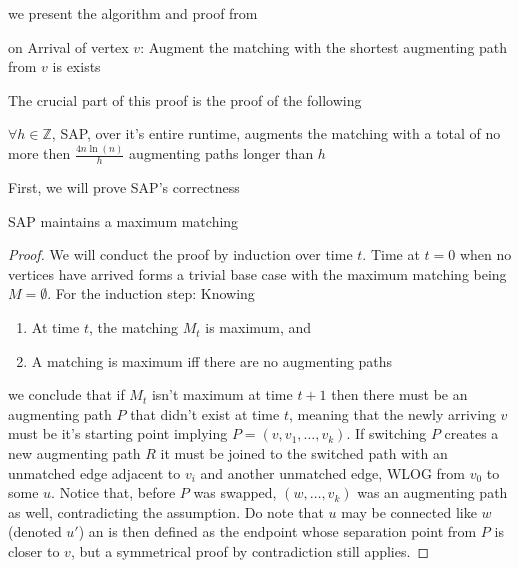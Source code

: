 we present the algorithm and proof from \cite{obmRecourse}
\begin{algorithm}
	\caption{SAP}
	\label{alg:sap}
	\begin{algorithmic}
		\item on Arrival of vertex $v$: Augment the matching with the shortest augmenting path from $v$ is exists
	\end{algorithmic}
\end{algorithm}

The crucial part of this proof is the proof of the following
\begin{lemma}
	\label{recourse-crucial}
	$\forall h\in\mathbb{Z}$, SAP, over it's entire runtime, augments the matching with a total of no more then $\frac{4n\ln(n)}{h}$ augmenting paths longer than $h$
\end{lemma}
First, we will prove SAP's correctness

\begin{lemma}
	SAP maintains a maximum matching
\end{lemma}
\begin{proof}
	We will conduct the proof by induction over time $t$. Time at $t=0$ when no vertices have arrived forms a trivial base case with the maximum matching being $M=\emptyset$. For the induction step:
	Knowing
	\begin{enumerate}
		\item At time $t$, the matching $M_t$ is maximum, and
		\item A matching is maximum iff there are no augmenting paths
	\end{enumerate}
	we conclude that if $M_t$ isn't maximum at time $t+1$ then there must be an augmenting path $P$ that didn't exist at time $t$, meaning that the newly arriving $v$ must be it's starting point implying $P=(v,v_1,\dots,v_k)$. If switching $P$ creates a new augmenting path $R$ it must be joined to the switched path with an unmatched edge adjacent to $v_i$ and another unmatched edge, WLOG from $v_0$ to some $u$. Notice that, before $P$ was swapped, $(w,\dots,v_k)$ was an augmenting path as well, contradicting the assumption. Do note that $u$ may be connected like $w$ (denoted $u'$) an is then defined as the endpoint whose separation point from $P$ is closer to $v$, but a symmetrical proof by contradiction still applies.
\end{proof}
\begin{figure}
	\centering
	
\end{figure}


